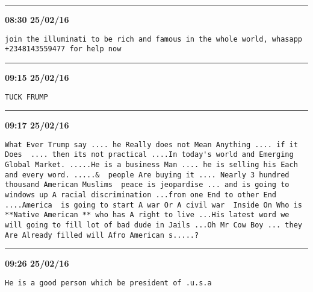 \hrule%

\begin{adjustwidth}{0cm}{0cm}
\footnotesize \textbf{08:30 25/02/16}

\begin{lstlisting}[breaklines, breakatwhitespace, basicstyle=\small, frame=leftline]
join the illuminati to be rich and famous in the whole world, whasapp +2348143559477 for help now
\end{lstlisting}
\end{adjustwidth}

\hrule%

\begin{adjustwidth}{0cm}{0cm}
\footnotesize \textbf{09:15 25/02/16}

\begin{lstlisting}[breaklines, breakatwhitespace, basicstyle=\small, frame=leftline]
TUCK FRUMP
\end{lstlisting}
\end{adjustwidth}

\hrule%

\begin{adjustwidth}{0cm}{0cm}
\footnotesize \textbf{09:17 25/02/16}

\begin{lstlisting}[breaklines, breakatwhitespace, basicstyle=\small, frame=leftline]
What Ever Trump say .... he Really does not Mean Anything .... if it Does  .... then its not practical ....In today's world and Emerging Global Market. .....He is a business Man .... he is selling his Each and every word. .....&  people Are buying it .... Nearly 3 hundred thousand American Muslims  peace is jeopardise ... and is going to windows up A racial discrimination ...from one End to other End ....America  is going to start A war Or A civil war  Inside On Who is  **Native American ** who has A right to live ...His latest word we will going to fill lot of bad dude in Jails ...Oh Mr Cow Boy ... they Are Already filled will Afro American s.....?
\end{lstlisting}
\end{adjustwidth}

\hrule%

\begin{adjustwidth}{0cm}{0cm}
\footnotesize \textbf{09:26 25/02/16}

\begin{lstlisting}[breaklines, breakatwhitespace, basicstyle=\small, frame=leftline]
He is a good person which be president of .u.s.a
\end{lstlisting}
\end{adjustwidth}

